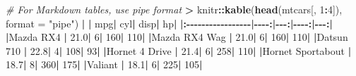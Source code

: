 \documentclass[
  a4paper,
  twoside,
  openright]{book}
\newenvironment{Shaded}{\begin{snugshade}}{\end{snugshade}}
\newcommand{\AttributeTok}[1]{\textcolor[rgb]{0.13,0.29,0.53}{#1}}
\newcommand{\CommentTok}[1]{\textcolor[rgb]{0.56,0.35,0.01}{\textit{#1}}}
\newcommand{\DecValTok}[1]{\textcolor[rgb]{0.00,0.00,0.81}{#1}}
\newcommand{\ErrorTok}[1]{\textcolor[rgb]{0.64,0.00,0.00}{\textbf{#1}}}
\newcommand{\FloatTok}[1]{\textcolor[rgb]{0.00,0.00,0.81}{#1}}
\newcommand{\FunctionTok}[1]{\textcolor[rgb]{0.13,0.29,0.53}{\textbf{#1}}}
\newcommand{\NormalTok}[1]{#1}
\newcommand{\SpecialCharTok}[1]{\textcolor[rgb]{0.81,0.36,0.00}{\textbf{#1}}}
\newcommand{\StringTok}[1]{\textcolor[rgb]{0.31,0.60,0.02}{#1}}
\theoremstyle{definition}
\theoremstyle{definition}
\theoremstyle{definition}
\theoremstyle{definition}
\theoremstyle{remark}
\begin{document}
\begin{Shaded}
\begin{Highlighting}[]
\CommentTok{\# For Markdown tables, use \textasciigrave{}pipe\textasciigrave{} format}
\SpecialCharTok{\textgreater{}}\NormalTok{ knitr}\SpecialCharTok{::}\FunctionTok{kable}\NormalTok{(}\FunctionTok{head}\NormalTok{(mtcars[, }\DecValTok{1}\SpecialCharTok{:}\DecValTok{4}\NormalTok{]), }\AttributeTok{format =} \StringTok{"pipe"}\NormalTok{)}
\SpecialCharTok{|}                  \ErrorTok{|}\NormalTok{  mpg}\SpecialCharTok{|}\NormalTok{ cyl}\SpecialCharTok{|}\NormalTok{ disp}\SpecialCharTok{|}\NormalTok{  hp}\SpecialCharTok{|}
\ErrorTok{|:}\SpecialCharTok{{-}{-}{-}{-}{-}{-}{-}{-}{-}{-}{-}{-}{-}{-}{-}{-}{-}}\ErrorTok{|}\SpecialCharTok{{-}{-}{-}{-}}\ErrorTok{:|}\SpecialCharTok{{-}{-}{-}}\ErrorTok{:|}\SpecialCharTok{{-}{-}{-}{-}}\ErrorTok{:|}\SpecialCharTok{{-}{-}{-}}\ErrorTok{:|}
\ErrorTok{|}\NormalTok{Mazda RX4         }\SpecialCharTok{|} \FloatTok{21.0}\SpecialCharTok{|}   \DecValTok{6}\SpecialCharTok{|}  \DecValTok{160}\SpecialCharTok{|} \DecValTok{110}\SpecialCharTok{|}
\ErrorTok{|}\NormalTok{Mazda RX4 Wag     }\SpecialCharTok{|} \FloatTok{21.0}\SpecialCharTok{|}   \DecValTok{6}\SpecialCharTok{|}  \DecValTok{160}\SpecialCharTok{|} \DecValTok{110}\SpecialCharTok{|}
\ErrorTok{|}\NormalTok{Datsun }\DecValTok{710}        \SpecialCharTok{|} \FloatTok{22.8}\SpecialCharTok{|}   \DecValTok{4}\SpecialCharTok{|}  \DecValTok{108}\SpecialCharTok{|}  \DecValTok{93}\SpecialCharTok{|}
\ErrorTok{|}\NormalTok{Hornet }\DecValTok{4}\NormalTok{ Drive    }\SpecialCharTok{|} \FloatTok{21.4}\SpecialCharTok{|}   \DecValTok{6}\SpecialCharTok{|}  \DecValTok{258}\SpecialCharTok{|} \DecValTok{110}\SpecialCharTok{|}
\ErrorTok{|}\NormalTok{Hornet Sportabout }\SpecialCharTok{|} \FloatTok{18.7}\SpecialCharTok{|}   \DecValTok{8}\SpecialCharTok{|}  \DecValTok{360}\SpecialCharTok{|} \DecValTok{175}\SpecialCharTok{|}
\ErrorTok{|}\NormalTok{Valiant           }\SpecialCharTok{|} \FloatTok{18.1}\SpecialCharTok{|}   \DecValTok{6}\SpecialCharTok{|}  \DecValTok{225}\SpecialCharTok{|} \DecValTok{105}\SpecialCharTok{|}


\end{Highlighting}
\end{Shaded}
\end{document}
